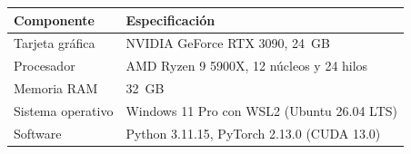 \begin{tabular}{ll}
\toprule
\textbf{Componente} & \textbf{Especificación} \\
\midrule
Tarjeta gráfica & NVIDIA GeForce RTX 3090, 24~GB \\
Procesador & AMD Ryzen 9 5900X, 12 núcleos y 24 hilos \\
Memoria RAM & 32~GB \\
Sistema operativo & Windows 11 Pro con WSL2 (Ubuntu 26.04 LTS) \\
Software & Python 3.11.15, PyTorch 2.13.0 (CUDA 13.0) \\
\bottomrule
\end{tabular}
